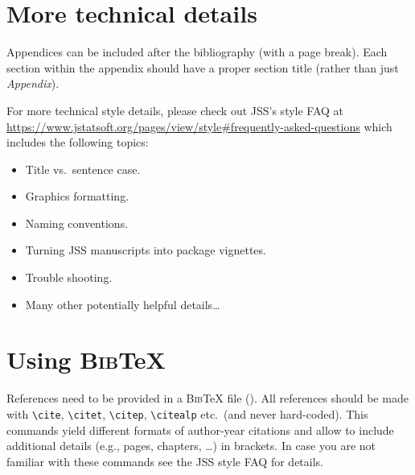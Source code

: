 \documentclass[article]{jss}
\begin{document}
\begin{appendix}

\section{More technical details} \label{app:technical}

\begin{leftbar}
Appendices can be included after the bibliography (with a page break). Each
section within the appendix should have a proper section title (rather than
just \emph{Appendix}).

For more technical style details, please check out JSS's style FAQ at
\url{https://www.jstatsoft.org/pages/view/style#frequently-asked-questions}
which includes the following topics:
\begin{itemize}
  \item Title vs.\ sentence case.
  \item Graphics formatting.
  \item Naming conventions.
  \item Turning JSS manuscripts into  package vignettes.
  \item Trouble shooting.
  \item Many other potentially helpful details\dots
\end{itemize}
\end{leftbar}


\section[Using BibTeX]{Using \textsc{Bib}{\TeX}} \label{app:bibtex}

\begin{leftbar}
References need to be provided in a \textsc{Bib}{\TeX} file (). All
references should be made with \verb|\cite|, \verb|\citet|, \verb|\citep|,
\verb|\citealp| etc.\ (and never hard-coded). This commands yield different
formats of author-year citations and allow to include additional details (e.g.,
pages, chapters, \dots) in brackets. In case you are not familiar with these
commands see the JSS style FAQ for details.


\end{leftbar}
\end{appendix}
\end{document}
